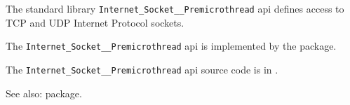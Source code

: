 
The standard library {\tt Internet\_Socket\_\_Premicrothread} api defines access to TCP and UDP Internet Protocol sockets.

The {\tt Internet\_Socket\_\_Premicrothread} api is implemented by the  package.

The {\tt Internet\_Socket\_\_Premicrothread} api source code is in .

See also:   package.





